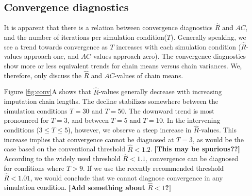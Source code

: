 \documentclass[article]{jss}
\begin{document}
\subsection{Convergence diagnostics}
It is apparent that there is a relation between convergence diagnostics $\widehat{R}$ and $AC$, and the number of iterations per simulation condition($T$). Generally speaking, we see a trend towards convergence as $T$ increases with each simulation condition ($\widehat{R}$-values approach one, and $AC$-values approach zero). The convergence diagnostics show more or less equivalent trends for chain means versus chain variances. We, therefore, only discuss the $\widehat{R}$ and $AC$-values of chain means. %

Figure \ref{fig:conv}A shows that $\widehat{R}$-values generally decrease with increasing imputation chain lengths. The decline stabilizes somewhere between the simulation conditions $T=30$ and $T=50$. The downward trend is most pronounced for $T=3$, and between $T = 5$ and $T = 10$. In the intervening conditions ($3 \leq T \leq 5$), however, we observe a steep increase in $\widehat{R}$-values. This increase implies that convergence cannot be diagnosed at $T=3$, as would be the case based on the conventional threshold $\widehat{R} < 1.2$. \textbf{[This may be spurious??]} According to the widely used threshold $\widehat{R} < 1.1$, convergence can be diagnosed for conditions where $T>9$. If we use the recently recommended threshold $\widehat{R} < 1.01$, we would conclude that we cannot diagnose convergence in any simulation condition. \textbf{[Add something about $\widehat{R} <1$?]}



\end{document}
